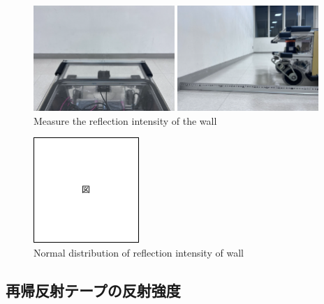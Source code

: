   \begin{figure}[h]
    \centering
    \begin{minipage}[c]{65mm} 
        \centering
        \includegraphics[height=40mm]{images/RobotGuidance_exp1_wall_from_back.png}
    \end{minipage}
    \begin{minipage}[c]{65mm} 
        \centering
        \includegraphics[height=40mm]{images/RobotGuidance_exp1_wall_from_side.png}
    \end{minipage}
    \caption{Measure the reflection intensity of the wall}
    \label{Fig:RobotGuidance_exp1_wall}
  \end{figure}

  \begin{figure}[h]
    \centering
    \includegraphics[keepaspectratio, scale=0.80] {images/figure.png}
    \captionsetup{justification=raggedright} %
    \caption{Normal distribution of reflection intensity of wall}
    \label{Fig:Normal distribution of reflection intensity of wall}
  \end{figure}

\newpage

\subsection{再帰反射テープの反射強度}

